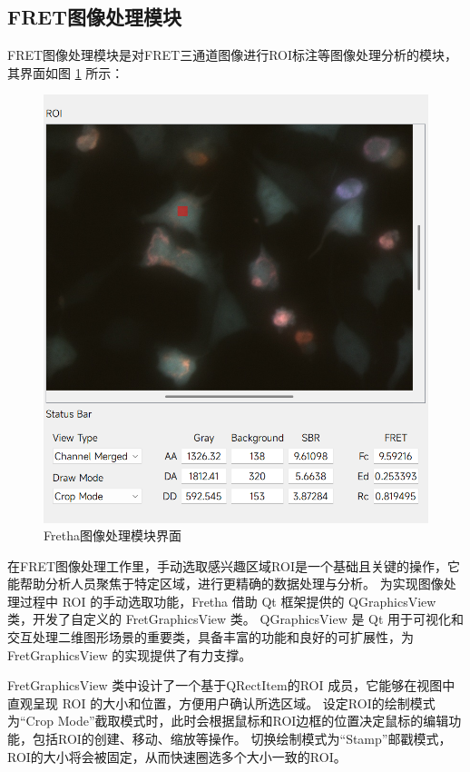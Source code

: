 \subsection{FRET图像处理模块}
\label{sec:FRET图像处理模块}
FRET图像处理模块是对FRET三通道图像进行ROI标注等图像处理分析的模块，其界面如图 \ref{fig:fretha_imageprocess_ui} 所示：
\begin{figure}[htbp]
    \centering
    \includegraphics[width=0.75\linewidth]{../figures/2/2_图像处理模块界面.png}
    \caption{Fretha图像处理模块界面}
    \label{fig:fretha_imageprocess_ui}
\end{figure}
在FRET图像处理工作里，手动选取感兴趣区域ROI是一个基础且关键的操作，它能帮助分析人员聚焦于特定区域，进行更精确的数据处理与分析。
为实现图像处理过程中 ROI 的手动选取功能，Fretha 借助 Qt 框架提供的 QGraphicsView 类，开发了自定义的 FretGraphicsView 类。
QGraphicsView 是 Qt 用于可视化和交互处理二维图形场景的重要类，具备丰富的功能和良好的可扩展性，为 FretGraphicsView 的实现提供了有力支撑。

FretGraphicsView 类中设计了一个基于QRectItem的ROI 成员，它能够在视图中直观呈现 ROI 的大小和位置，方便用户确认所选区域。
设定ROI的绘制模式为“Crop Mode”截取模式时，此时会根据鼠标和ROI边框的位置决定鼠标的编辑功能，包括ROI的创建、移动、缩放等操作。
切换绘制模式为“Stamp”邮戳模式，ROI的大小将会被固定，从而快速圈选多个大小一致的ROI。

